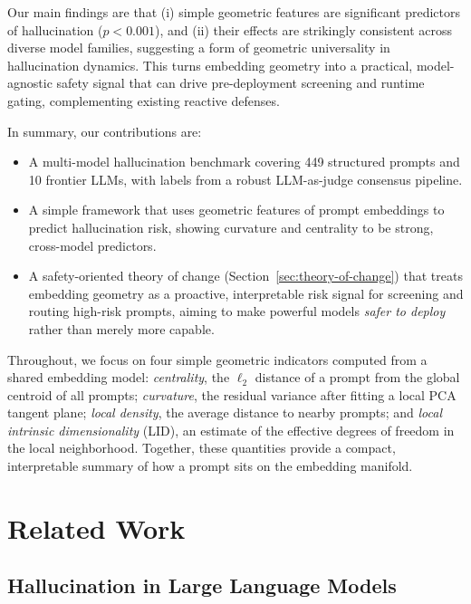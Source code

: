 \documentclass{article}
\begin{document}
Our main findings are that (i) simple geometric features are significant predictors of hallucination ($p < 0.001$), and (ii) their effects are strikingly consistent across diverse model families, suggesting a form of geometric universality in hallucination dynamics. This turns embedding geometry into a practical, model-agnostic safety signal that can drive pre-deployment screening and runtime gating, complementing existing reactive defenses.

In summary, our contributions are:
\begin{itemize}
    \item A multi-model hallucination benchmark covering 449 structured prompts and 10 frontier LLMs, with labels from a robust LLM-as-judge consensus pipeline.
    \item A simple framework that uses geometric features of prompt embeddings to predict hallucination risk, showing curvature and centrality to be strong, cross-model predictors.
    \item A safety-oriented theory of change (Section~\ref{sec:theory-of-change}) that treats embedding geometry as a proactive, interpretable risk signal for screening and routing high-risk prompts, aiming to make powerful models \emph{safer to deploy} rather than merely more capable.
\end{itemize}

Throughout, we focus on four simple geometric indicators computed from a shared embedding model: \emph{centrality}, the $\ell_2$ distance of a prompt from the global centroid of all prompts; \emph{curvature}, the residual variance after fitting a local PCA tangent plane; \emph{local density}, the average distance to nearby prompts; and \emph{local intrinsic dimensionality} (LID), an estimate of the effective degrees of freedom in the local neighborhood. Together, these quantities provide a compact, interpretable summary of how a prompt sits on the embedding manifold.

\section{Related Work}

\subsection{Hallucination in Large Language Models}
\end{document}

